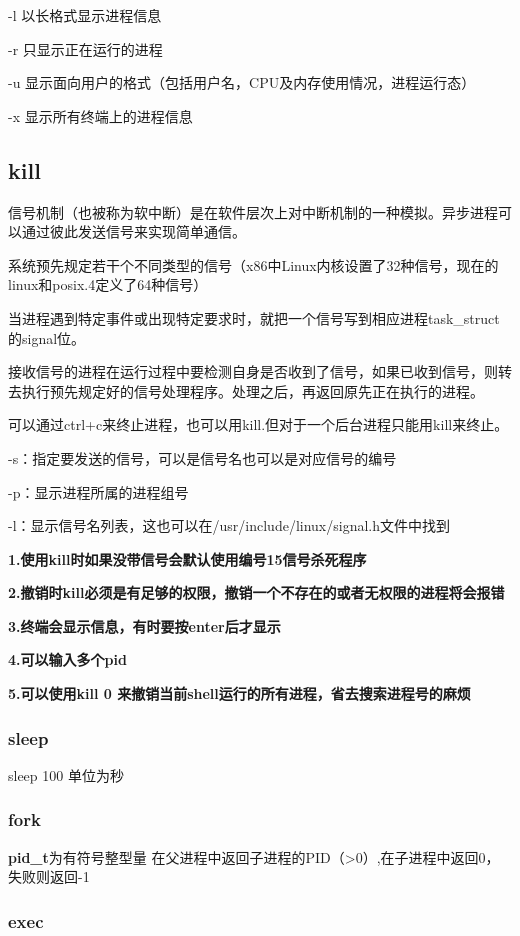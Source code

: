 \documentclass{ctexart}
\begin{document}
-l 以长格式显示进程信息

-r 只显示正在运行的进程

-u 显示面向用户的格式（包括用户名，CPU及内存使用情况，进程运行态）

-x 显示所有终端上的进程信息

\subsection{kill}
信号机制（也被称为软中断）是在软件层次上对中断机制的一种模拟。异步进程可以通过彼此发送信号来实现简单通信。

系统预先规定若干个不同类型的信号（x86中Linux内核设置了32种信号，现在的linux和posix.4定义了64种信号）

当进程遇到特定事件或出现特定要求时，就把一个信号写到相应进程task\_struct的signal位。

接收信号的进程在运行过程中要检测自身是否收到了信号，如果已收到信号，则转去执行预先规定好的信号处理程序。处理之后，再返回原先正在执行的进程。

可以通过ctrl+c来终止进程，也可以用kill.但对于一个后台进程只能用kill来终止。

-s：指定要发送的信号，可以是信号名也可以是对应信号的编号

-p：显示进程所属的进程组号

-l：显示信号名列表，这也可以在/usr/include/linux/signal.h文件中找到

\textbf{1.使用kill时如果没带信号会默认使用编号15信号杀死程序}

\textbf{2.撤销时kill必须是有足够的权限，撤销一个不存在的或者无权限的进程将会报错}

\textbf{3.终端会显示信息，有时要按enter后才显示}

\textbf{4.可以输入多个pid}

\textbf{5.可以使用kill 0 来撤销当前shell运行的所有进程，省去搜索进程号的麻烦}

\subsubsection{sleep}
sleep 100 单位为秒
\subsubsection{fork}
\textbf{pid\_t}为有符号整型量
在父进程中返回子进程的PID（>0）,在子进程中返回0，失败则返回-1

\subsubsection{exec}
\end{document}
